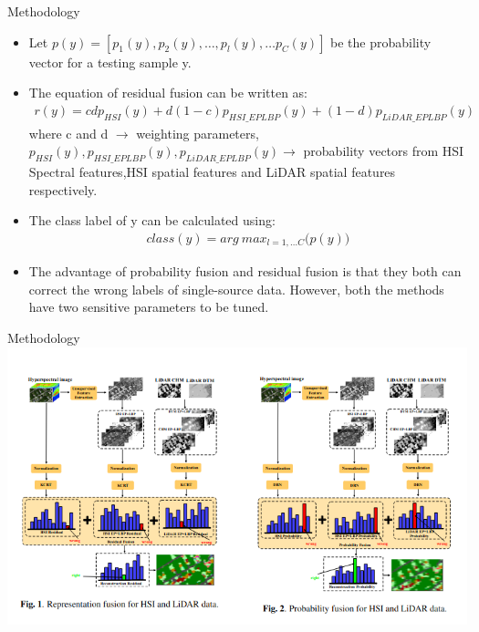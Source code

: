 \documentclass{beamer}
\begin{document}
\begin{frame}{Methodology}
    \begin{itemize}
        \item Let $p(y) = [p_1(y),p_2(y), \dots ,p_l(y), \dots p_C(y)]$ be the probability vector for a testing sample y.
        \item The equation of residual fusion can be written as:
        \begin{align}
            r(y) = cdp_{HSI}(y) + d(1-c)p_{HSI\_EPLBP}(y) + (1-d)p_{LiDAR\_EPLBP}(y)
        \end{align}
         where c and d $\rightarrow$ weighting parameters, $p_{HSI}(y),p_{HSI\_EPLBP}(y),p_{LiDAR\_EPLBP}(y) \rightarrow$ probability vectors from HSI Spectral features,HSI spatial features and LiDAR spatial features respectively.
        \item The class label of y can be calculated using:
        \begin{align}
            class(y) = arg\ max_{l = 1, \dots C}\big(p(y)\big)
        \end{align}
        \item The advantage of probability fusion and residual fusion is that they both can correct the wrong labels of single-source data. However, both the methods have two sensitive parameters to be tuned.
    \end{itemize}
\end{frame}

\begin{frame}{Methodology}
    \includegraphics[scale=0.5]{fig_1_and_2}
\end{frame}
\end{document}
